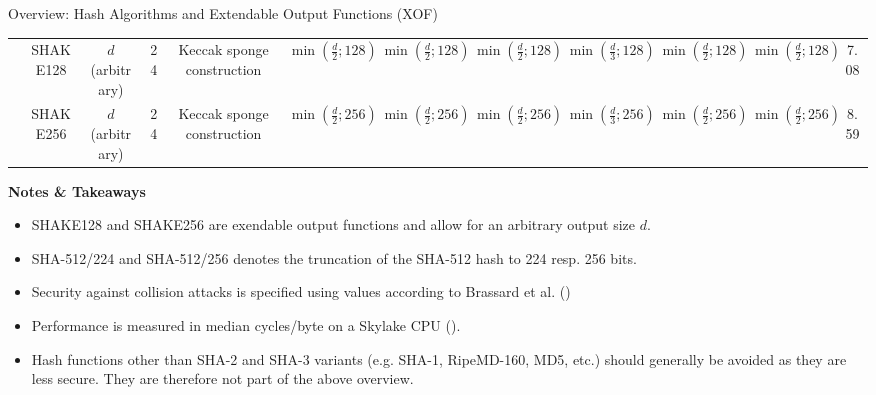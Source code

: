 \begin{algorithmbox}{Overview: Hash Algorithms and Extendable Output Functions (XOF) \tbv}
\begin{center}
\begin{tabular}{ccccc|ccc|ccc|c}
            & SHAKE128 & $d$ (arbitrary) & 24 & Keccak sponge construction & $\min\left(\frac{d}{2}; 128\right)$ & $\min\left(\frac{d}{2}; 128\right)$ & $\min\left(\frac{d}{2}; 128\right)$ & $\min\left(\frac{d}{3}; 128\right)$ & $\min\left(\frac{d}{2}; 128\right)$ & $\min\left(\frac{d}{2}; 128\right)$ & 7.08\\
            & SHAKE256 & $d$ (arbitrary) & 24 & Keccak sponge construction & $\min\left(\frac{d}{2}; 256\right)$ & $\min\left(\frac{d}{2}; 256\right)$ & $\min\left(\frac{d}{2}; 256\right)$ & $\min\left(\frac{d}{3}; 256\right)$ & $\min\left(\frac{d}{2}; 256\right)$ & $\min\left(\frac{d}{2}; 256\right)$ & 8.59\\
            \hline
        \end{tabular}
    \end{center}
    {\bfseries Notes \& Takeaways}
    \normalfont
    \begin{itemize}
        \item SHAKE128 and SHAKE256 are exendable output functions and allow for an arbitrary output size $d$.
        \item SHA-512/224 and SHA-512/256 denotes the truncation of the SHA-512 hash to 224 resp. 256 bits.
        \item Security against collision attacks is specified using values according to Brassard et al. ()
        \item Performance is measured in median cycles/byte on a Skylake CPU ().
        \item Hash functions other than SHA-2 and SHA-3 variants (e.g. SHA-1, RipeMD-160, MD5, etc.) should generally be avoided as they are less secure. They are therefore not part of the above overview.
    \end{itemize}
\end{algorithmbox}
